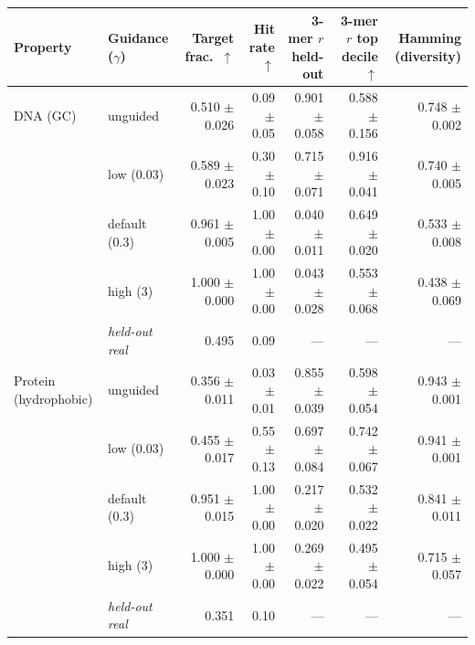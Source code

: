 \begin{tabular}{llrrrrr}
\toprule
Property & Guidance ($\gamma$) & Target frac.\ $\uparrow$ & Hit rate $\uparrow$ & 3-mer $r$ held-out & 3-mer $r$ top decile $\uparrow$ & Hamming (diversity) \\
\midrule
DNA (GC) & unguided & 0.510 $\pm$ 0.026 & 0.09 $\pm$ 0.05 & 0.901 $\pm$ 0.058 & 0.588 $\pm$ 0.156 & 0.748 $\pm$ 0.002 \\
 & low (0.03) & 0.589 $\pm$ 0.023 & 0.30 $\pm$ 0.10 & 0.715 $\pm$ 0.071 & 0.916 $\pm$ 0.041 & 0.740 $\pm$ 0.005 \\
 & default (0.3) & 0.961 $\pm$ 0.005 & 1.00 $\pm$ 0.00 & 0.040 $\pm$ 0.011 & 0.649 $\pm$ 0.020 & 0.533 $\pm$ 0.008 \\
 & high (3) & 1.000 $\pm$ 0.000 & 1.00 $\pm$ 0.00 & 0.043 $\pm$ 0.028 & 0.553 $\pm$ 0.068 & 0.438 $\pm$ 0.069 \\
 & \emph{held-out real} & 0.495 & 0.09 & --- & --- & --- \\
\midrule
Protein (hydrophobic) & unguided & 0.356 $\pm$ 0.011 & 0.03 $\pm$ 0.01 & 0.855 $\pm$ 0.039 & 0.598 $\pm$ 0.054 & 0.943 $\pm$ 0.001 \\
 & low (0.03) & 0.455 $\pm$ 0.017 & 0.55 $\pm$ 0.13 & 0.697 $\pm$ 0.084 & 0.742 $\pm$ 0.067 & 0.941 $\pm$ 0.001 \\
 & default (0.3) & 0.951 $\pm$ 0.015 & 1.00 $\pm$ 0.00 & 0.217 $\pm$ 0.020 & 0.532 $\pm$ 0.022 & 0.841 $\pm$ 0.011 \\
 & high (3) & 1.000 $\pm$ 0.000 & 1.00 $\pm$ 0.00 & 0.269 $\pm$ 0.022 & 0.495 $\pm$ 0.054 & 0.715 $\pm$ 0.057 \\
 & \emph{held-out real} & 0.351 & 0.10 & --- & --- & --- \\
\bottomrule
\end{tabular}
